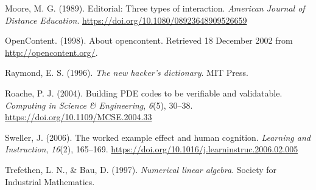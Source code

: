 \documentclass[]{book}
\begin{document}
\leavevmode\hypertarget{ref-moore1989three}{}%
Moore, M. G. (1989). Editorial: Three types of interaction. \emph{American Journal of Distance Education}. \url{https://doi.org/10.1080/08923648909526659}

\leavevmode\hypertarget{ref-OC1998}{}%
OpenContent. (1998). About opencontent. Retrieved 18 December 2002 from \url{http://opencontent.org/}.

\leavevmode\hypertarget{ref-raymond1996new}{}%
Raymond, E. S. (1996). \emph{The new hacker's dictionary}. MIT Press.

\leavevmode\hypertarget{ref-roache2004bpc}{}%
Roache, P. J. (2004). Building PDE codes to be verifiable and validatable. \emph{Computing in Science \& Engineering}, \emph{6}(5), 30--38. \url{https://doi.org/10.1109/MCSE.2004.33}

\leavevmode\hypertarget{ref-sweller2006worked}{}%
Sweller, J. (2006). The worked example effect and human cognition. \emph{Learning and Instruction}, \emph{16}(2), 165--169. \url{https://doi.org/10.1016/j.learninstruc.2006.02.005}

\leavevmode\hypertarget{ref-trefethen1997numerical}{}%
Trefethen, L. N., \& Bau, D. (1997). \emph{Numerical linear algebra}. Society for Industrial Mathematics.
\end{document}
